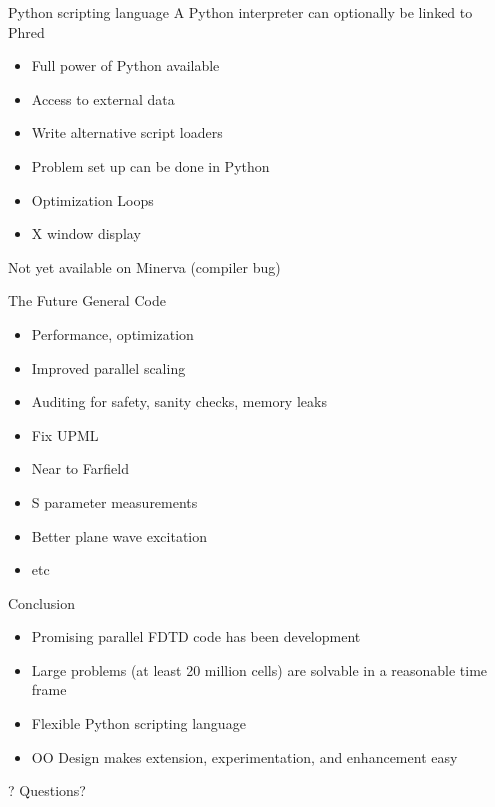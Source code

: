 \documentclass[pdf, nototal, slideBW]{prosper}
\begin{document}
\begin{slide}{Python scripting language}
  A Python interpreter can optionally be linked to Phred

  \begin{itemize}
  \item Full power of Python available
  \item Access to external data
  \item Write alternative script loaders
  \item Problem set up can be done in Python
  \item Optimization Loops
  \item X window display 
  \end{itemize}

  Not yet available on Minerva (compiler bug)
\end{slide}

\begin{slide}{The Future}
  General Code
  \begin{itemize}
  \item Performance, optimization
  \item Improved parallel scaling
  \item Auditing for safety, sanity checks, memory leaks
  \end{itemize}

  \vspace{0.5cm}
  \begin{itemize}
  \item Fix UPML
  \item Near to Farfield
  \item S parameter measurements
  \item Better plane wave excitation
  \item etc
  \end{itemize}
\end{slide}

\begin{slide}{Conclusion}
  \begin{itemize}
  \item Promising parallel FDTD code has been development
  \item Large problems (at least 20 million cells) are solvable in a
  reasonable time frame
  \item Flexible Python scripting language
  \item OO Design makes extension, experimentation, and enhancement easy 
  \end{itemize}
\end{slide}

\begin{slide}{?}
\huge
\vspace{1cm}
Questions?
\end{slide}
\end{document}
